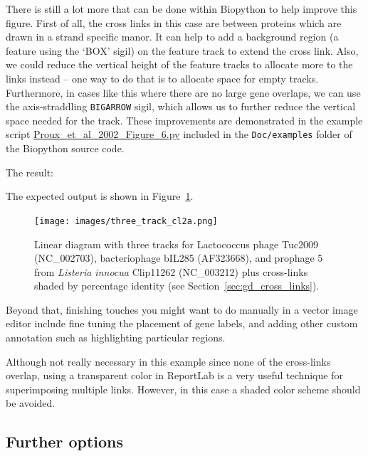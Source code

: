 \documentclass{report}
\begin{document}
There is still a lot more that can be done within Biopython to help
improve this figure. First of all, the cross links in this case are
between proteins which are drawn in a strand specific manor. It can
help to add a background region (a feature using the `BOX' sigil) on the
feature track to extend the cross link. Also, we could reduce the vertical
height of the feature tracks to allocate more to the links instead -- one
way to do that is to allocate space for empty tracks. Furthermore,
in cases like this where there are no large gene overlaps, we can use
the axis-straddling \verb|BIGARROW| sigil, which allows us to further
reduce the vertical space needed for the track. These improvements
are demonstrated in the example script
\href{http://biopython.org/SRC/biopython/Doc/examples/Proux_et_al_2002_Figure_6.py}{Proux\_et\_al\_2002\_Figure\_6.py}
included in the \texttt{Doc/examples} folder of the Biopython source code.
\begin{htmlonly}
\noindent The result:


\end{htmlonly}
\begin{latexonly}
\noindent The expected output is shown in Figure~\ref{fig:three_track_cl2}.
\begin{figure}[htbp]
\centering
\texttt{[image: images/three\_track\_cl2a.png]}
\caption{Linear diagram with three tracks for Lactococcus phage Tuc2009
(NC\_002703), bacteriophage bIL285 (AF323668), and prophage 5 from
\textit{Listeria innocua} Clip11262 (NC\_003212) plus cross-links
shaded by percentage identity (see Section~\ref{sec:gd_cross_links}).}
\label{fig:three_track_cl2}
\end{figure}
\end{latexonly}

Beyond that, finishing touches you might want to do manually in a vector
image editor include fine tuning the placement of gene labels, and adding
other custom annotation such as highlighting particular regions.

Although not really necessary in this example since none of the cross-links
overlap, using a transparent color in ReportLab is a very useful technique
for superimposing multiple links. However, in this case a shaded color
scheme should be avoided.

\subsection{Further options}
\end{document}

